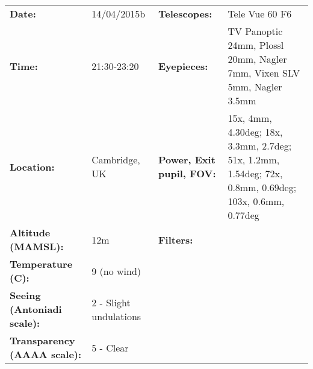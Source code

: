 \begin{tabular}{ p{1.7in} p{1.2in} p{1.5in} p{4.2in}}
{\bf Date:} & 14/04/2015b & {\bf Telescopes:} & Tele Vue 60 F6 \\ 
{\bf Time:} & 21:30-23:20 & {\bf Eyepieces:} & TV Panoptic 24mm, Plossl 20mm, Nagler 7mm, Vixen SLV 5mm, Nagler 3.5mm \\ 
{\bf Location:} & Cambridge, UK & {\bf Power, Exit pupil, FOV:} & 15x, 4mm, 4.30deg; 18x, 3.3mm, 2.7deg; 51x, 1.2mm, 1.54deg; 72x, 0.8mm, 0.69deg; 103x, 0.6mm, 0.77deg \\ 
{\bf Altitude (MAMSL):} & 12m & {\bf Filters:} &  \\ 
{\bf Temperature (C):} & 9 (no wind) & & \\ 
{\bf Seeing (Antoniadi scale):} & 2 - Slight undulations & & \\ 
{\bf Transparency (AAAA scale):} & 5 - Clear & & \\ 
\end{tabular}
\centering 
